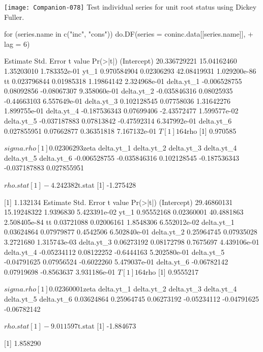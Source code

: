 \documentclass[a4paper]{article}
\begin{document}
\begin{Schunk}
\end{Schunk}
\texttt{[image: Companion-078]}
Test individual series for unit root status using Dickey Fuller.
\begin{Schunk}
\begin{Sinput}
 for (series.name in c("inc", "cons")) do.DF(series = coninc.data[[series.name]], 
+     lag = 6)
\end{Sinput}
\begin{Soutput}
                Estimate  Std. Error     t value     Pr(>|t|)
(Intercept) 20.336729221 15.04162460  1.35203010 1.783352e-01
yt_1         0.970584904  0.02306293 42.08419931 1.029200e-86
tt           0.023796844  0.01985318  1.19864142 2.324968e-01
delta.yt_1  -0.006528755  0.08092856 -0.08067307 9.358060e-01
delta.yt_2  -0.035846316  0.08025935 -0.44663103 6.557649e-01
delta.yt_3   0.102128545  0.07758036  1.31642276 1.899755e-01
delta.yt_4  -0.187536343  0.07699406 -2.43572477 1.599577e-02
delta.yt_5  -0.037187883  0.07813842 -0.47592314 6.347992e-01
delta.yt_6   0.027855951  0.07662877  0.36351818 7.167132e-01
$T
[1] 164

$rho
[1] 0.970585

$sigma.rho
[1] 0.02306293

$zeta
  delta.yt_1   delta.yt_2   delta.yt_3   delta.yt_4   delta.yt_5   delta.yt_6 
-0.006528755 -0.035846316  0.102128545 -0.187536343 -0.037187883  0.027855951 

$rho.stat
[1] -4.242382

$t.stat
[1] -1.275428

[1] 1.132134
               Estimate  Std. Error    t value     Pr(>|t|)
(Intercept) 29.46860131 15.19248322  1.9396830 5.423391e-02
yt_1         0.95552168  0.02360001 40.4881863 2.508405e-84
tt           0.03721088  0.02006161  1.8548306 6.552012e-02
delta.yt_1   0.03624864  0.07979877  0.4542506 6.502840e-01
delta.yt_2   0.25964745  0.07935028  3.2721680 1.315743e-03
delta.yt_3   0.06273192  0.08172798  0.7675697 4.439106e-01
delta.yt_4  -0.05234112  0.08122252 -0.6444163 5.202580e-01
delta.yt_5  -0.04791625  0.07956524 -0.6022260 5.479037e-01
delta.yt_6  -0.06782142  0.07919698 -0.8563637 3.931186e-01
$T
[1] 164

$rho
[1] 0.9555217

$sigma.rho
[1] 0.02360001

$zeta
 delta.yt_1  delta.yt_2  delta.yt_3  delta.yt_4  delta.yt_5  delta.yt_6 
 0.03624864  0.25964745  0.06273192 -0.05234112 -0.04791625 -0.06782142 

$rho.stat
[1] -9.011597

$t.stat
[1] -1.884673

[1] 1.858290
\end{Soutput}
\end{Schunk}
\end{document}
